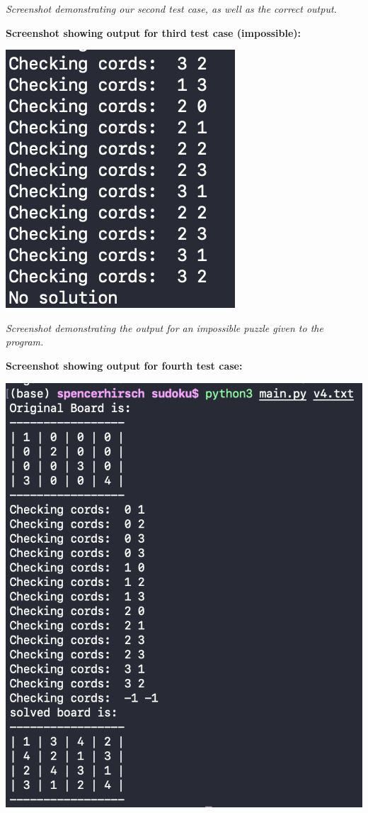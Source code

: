 \documentclass{article}
\begin{document}
\textit{Screenshot demonstrating our second test case, as well as the correct output.}

\pagebreak

\textbf{Screenshot showing output for third test case (impossible):}

\bigskip

\includegraphics{impossible_output.png}

\textit{Screenshot demonstrating the output for an impossible puzzle given to the program.}

\pagebreak

\textbf{Screenshot showing output for fourth test case:}

\bigskip

\includegraphics{test4.png}
\end{document}
